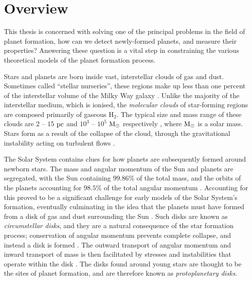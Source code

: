 \section{Overview}

This thesis is concerned with solving one of the principal problems in the field of planet formation, how can we detect newly-formed planets, and measure their properties?
Answering these question is a vital step in constraining the various theoretical models of the planet formation process.

Stars and planets are born inside vast, interstellar clouds of gas and dust.
Sometimes called ``stellar nurseries'', these regions make up less than one percent of the interstellar volume of the Milky Way galaxy \citep{ferriere2001}.
Unlike the majority of the interstellar medium, which is ionised, the \textit{molecular clouds} of star-forming regions are composed primarily of gaseous H$_2$.
The typical size and mass range of these clouds are $2$ -- $15$ $\rm{pc}$ and $10^3$ -- $10^5$ $\rm{M_\odot}$ respectively \citep{cambresy1999}, where $\rm{M_\odot}$ is a solar mass.
Stars form as a result of the collapse of the cloud, through the gravitational instability acting on turbulent flows \citep[see review by][]{maclow2004}.

The Solar System contains clues for how planets are subsequently formed around newborn stars.
The mass and angular momentum of the Sun and planets are segregated, with the Sun containing $99.86 \%$ of the total mass, and the orbits of the planets accounting for $98.5 \%$ of the total angular momentum \citep[e.g.][]{woolfson2000}.
Accounting for this proved to be a significant challenge for early models of the Solar System's formation, eventually culminating in the idea that the planets must have formed from a disk of gas and dust surrounding the Sun \citep[see review by][]{edgeworth1949}.
Such disks are known as \textit{circumstellar disks}, and they are a natural consequence of the star formation process; conservation of angular momentum prevents complete collapse, and instead a disk is formed \citep{hoyle1953}.
The outward transport of angular momentum and inward transport of mass is then facilitated by stresses and instabilities that operate within the disk \citep{lynden-bell1974,pringle1981}.
The disks found around young stars are thought to be the sites of planet formation, and are therefore known as \textit{protoplanetary disks}.

